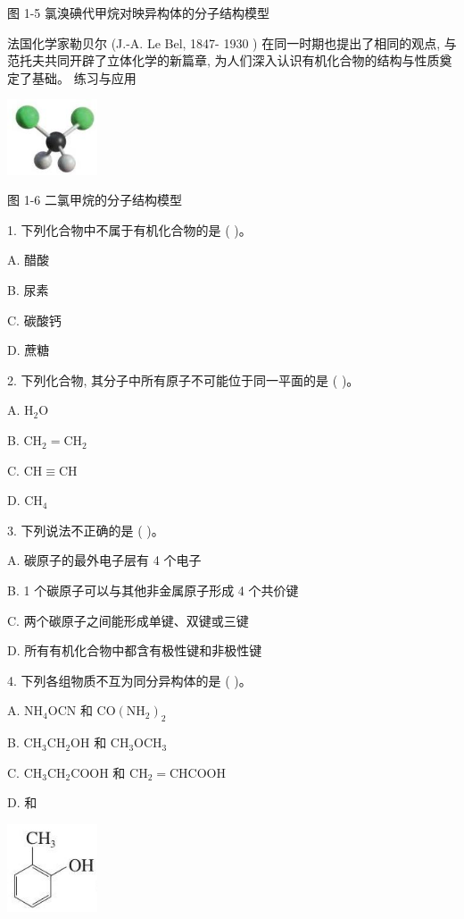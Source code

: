 \documentclass[10pt]{article}
\begin{document}
图 1-5 氯溴碘代甲烷对映异构体的分子结构模型

法国化学家勒贝尔 (J.-A. Le Bel, 1847- 1930 ) 在同一时期也提出了相同的观点, 与范托夫共同开辟了立体化学的新篇章, 为人们深入认识有机化合物的结构与性质奠定了基础。 练习与应用

\begin{center}
\includegraphics[max width=0.2\textwidth]{images/0190efc5-b58a-7c43-bfb0-e0a030df9cfd_16_755542.jpg}
\end{center}

图 1-6 二氯甲烷的分子结构模型

1. 下列化合物中不属于有机化合物的是 ( )。

A. 醋酸

B. 尿素

C. 碳酸钙

D. 蔗糖

2. 下列化合物, 其分子中所有原子不可能位于同一平面的是 ( )。

A. \({\mathrm{H}}_{2}\mathrm{O}\)

B. \({\mathrm{{CH}}}_{2} = {\mathrm{{CH}}}_{2}\)

C. \(\mathrm{{CH}} \equiv \mathrm{{CH}}\)

D. \({\mathrm{{CH}}}_{4}\)

3. 下列说法不正确的是 ( )。

A. 碳原子的最外电子层有 4 个电子

B. 1 个碳原子可以与其他非金属原子形成 4 个共价键

C. 两个碳原子之间能形成单键、双键或三键

D. 所有有机化合物中都含有极性键和非极性键

4. 下列各组物质不互为同分异构体的是 ( )。

A. \({\mathrm{{NH}}}_{4}\mathrm{{OCN}}\) 和 \(\mathrm{{CO}}{\left( {\mathrm{{NH}}}_{2}\right) }_{2}\)

B. \({\mathrm{{CH}}}_{3}{\mathrm{{CH}}}_{2}\mathrm{{OH}}\) 和 \({\mathrm{{CH}}}_{3}{\mathrm{{OCH}}}_{3}\)

C. \({\mathrm{{CH}}}_{3}{\mathrm{{CH}}}_{2}\mathrm{{COOH}}\) 和 \({\mathrm{{CH}}}_{2} = \mathrm{{CHCOOH}}\)

D. 和

\begin{center}
\includegraphics[max width=0.2\textwidth]{images/0190efc5-b58a-7c43-bfb0-e0a030df9cfd_17_878767.jpg}
\end{center}
\end{document}
